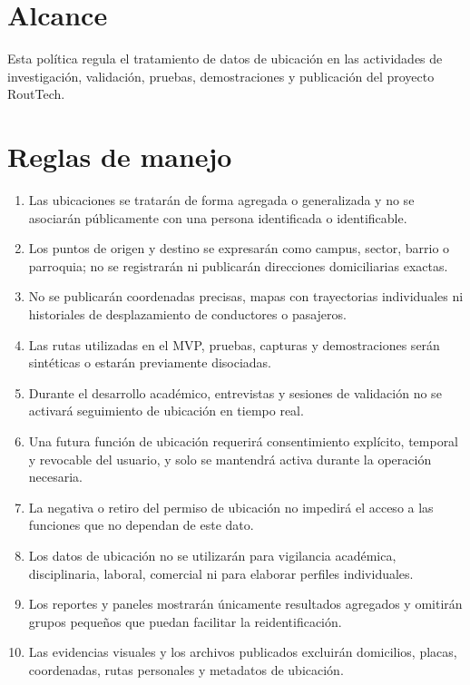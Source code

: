 \documentclass[10pt,a4paper]{article}
\begin{document}
\section{Alcance}

Esta política regula el tratamiento de datos de ubicación en las actividades de investigación, validación, pruebas, demostraciones y publicación del proyecto RoutTech.

\section{Reglas de manejo}

\begin{enumerate}
  \item Las ubicaciones se tratarán de forma agregada o generalizada y no se asociarán públicamente con una persona identificada o identificable.
  \item Los puntos de origen y destino se expresarán como campus, sector, barrio o parroquia; no se registrarán ni publicarán direcciones domiciliarias exactas.
  \item No se publicarán coordenadas precisas, mapas con trayectorias individuales ni historiales de desplazamiento de conductores o pasajeros.
  \item Las rutas utilizadas en el MVP, pruebas, capturas y demostraciones serán sintéticas o estarán previamente disociadas.
  \item Durante el desarrollo académico, entrevistas y sesiones de validación no se activará seguimiento de ubicación en tiempo real.
  \item Una futura función de ubicación requerirá consentimiento explícito, temporal y revocable del usuario, y solo se mantendrá activa durante la operación necesaria.
  \item La negativa o retiro del permiso de ubicación no impedirá el acceso a las funciones que no dependan de este dato.
  \item Los datos de ubicación no se utilizarán para vigilancia académica, disciplinaria, laboral, comercial ni para elaborar perfiles individuales.
  \item Los reportes y paneles mostrarán únicamente resultados agregados y omitirán grupos pequeños que puedan facilitar la reidentificación.
  \item Las evidencias visuales y los archivos publicados excluirán domicilios, placas, coordenadas, rutas personales y metadatos de ubicación.
\end{enumerate}
\end{document}
